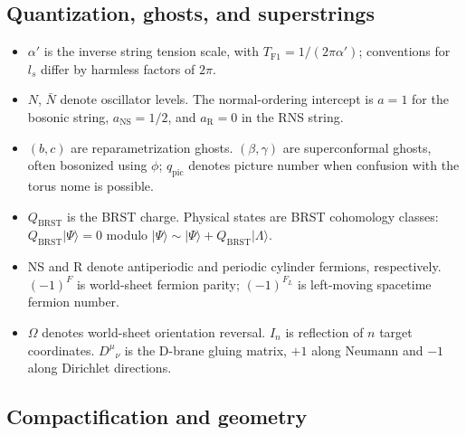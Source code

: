 \documentclass[
  10pt,
  a4paper,
  openany]{book}
\providecommand{\tightlist}{%
  \setlength{\itemsep}{0pt}\setlength{\parskip}{0pt}}
\newcommand{\ket}[1]{\lvert #1\rangle}
\begin{document}
\subsection{Quantization, ghosts, and
superstrings}\label{quantization-ghosts-and-superstrings}

\begin{itemize}
\tightlist
\item
  \(\alpha'\) is the inverse string tension scale, with
  \(T_{\mathrm F1}=1/(2\pi\alpha')\); conventions for \(l_s\) differ by
  harmless factors of \(2\pi\).
\item
  \(N\), \(\bar N\) denote oscillator levels. The normal-ordering
  intercept is \(a=1\) for the bosonic string, \(a_{\mathrm{NS}}=1/2\),
  and \(a_{\mathrm R}=0\) in the RNS string.
\item
  \((b,c)\) are reparametrization ghosts. \((\beta,\gamma)\) are
  superconformal ghosts, often bosonized using \(\phi\);
  \(q_{\mathrm{pic}}\) denotes picture number when confusion with the
  torus nome is possible.
\item
  \(Q_{\mathrm{BRST}}\) is the BRST charge. Physical states are BRST
  cohomology classes: \(Q_{\mathrm{BRST}}\ket{\Psi}=0\) modulo
  \(\ket{\Psi}\sim\ket{\Psi}+Q_{\mathrm{BRST}}\ket{\Lambda}\).
\item
  NS and R denote antiperiodic and periodic cylinder fermions,
  respectively. \((-1)^F\) is world-sheet fermion parity; \((-1)^{F_L}\)
  is left-moving spacetime fermion number.
\item
  \(\Omega\) denotes world-sheet orientation reversal. \(I_n\) is
  reflection of \(n\) target coordinates. \(D^\mu{}_{\nu}\) is the
  D-brane gluing matrix, \(+1\) along Neumann and \(-1\) along Dirichlet
  directions.
\end{itemize}

\subsection{Compactification and
geometry}\label{compactification-and-geometry}
\end{document}
